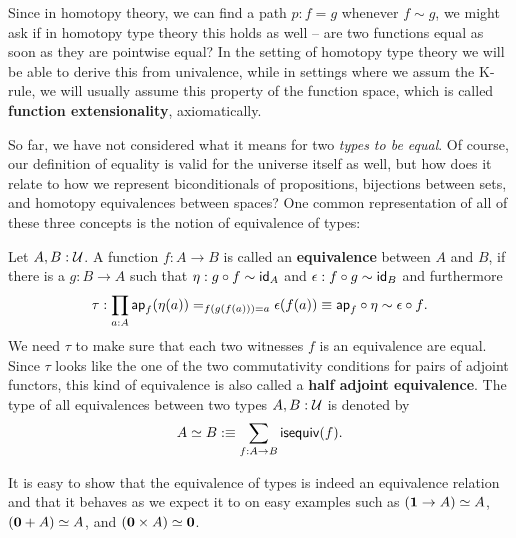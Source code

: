\begin{remark}\label{rmk:tt-funext}
Since in homotopy theory, we can find a path $p : f = g$ whenever $f \sim g$,
we might ask if in homotopy type theory this holds as well --
are two functions equal as soon as they are pointwise equal?
In the setting of homotopy type theory we will be able to derive this from
univalence, while in settings where we assum the K-rule, we will usually
assume this property of the function space, which is called \textbf{function extensionality},
axiomatically.
\end{remark}

So far, we have not considered what it means for two \emph{types to be equal}.
Of course, our definition of equality is valid for the universe itself as well,
but how does it relate to how we represent
biconditionals of propositions,
bijections between sets,
and homotopy equivalences between spaces?
One common representation of all of these three concepts is the notion of
equivalence of types:
\begin{defn}[Equivalences]\label{def:tt-hae}
Let $A, B : \mathcal{U}$. A function $f : A \to B$ is called an \textbf{equivalence}
between $A$ and $B$, if there is a $g : B \to A$ such that
$\eta : g \circ f \sim \mathsf{id}_A$ and $\epsilon : f \circ g \sim \mathsf{id}_B$ and furthermore
\begin{equation*}
\tau : \prod_{a : A} \mathsf{ap}_f(\eta(a)) =_{f(g(f(a)))=a} \epsilon(f(a)) 
 \equiv \mathsf{ap}_f \circ \eta \sim \epsilon \circ f \text{.}
\end{equation*}
We need $\tau$ to make sure that each two witnesses $f$ is an equivalence are
equal.
Since $\tau$ looks like the one of the two commutativity conditions for pairs
of adjoint functors, this kind of equivalence is also called a \textbf{half
adjoint equivalence}.
The type of all equivalences between two types $A, B : \mathcal{U}$ is denoted by
\begin{equation*}
A \simeq B :\equiv \sum_{f : A \to B} \mathsf{isequiv}(f) \text{.}
\end{equation*}
\end{defn}
It is easy to show that the equivalence of types is indeed an equivalence relation
and that it behaves as we expect it to on easy examples such as
$(\mathbf{1} \to A) \simeq A$, $(\mathbf{0} + A) \simeq A$, and
$(\mathbf{0} \times A) \simeq \mathbf{0}$.

